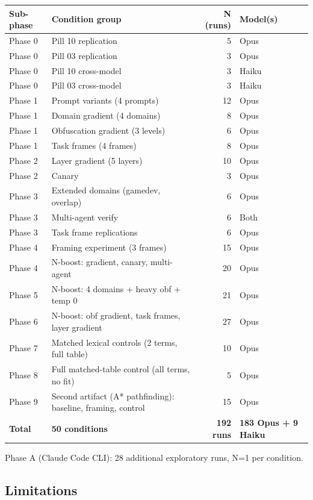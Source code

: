 \documentclass[11pt]{article}
\begin{document}
\begin{table}[ht]
\centering
\small
\begin{tabular}{@{}lp{6.5cm}rl@{}}
\toprule
Sub-phase & Condition group & N (runs) & Model(s) \\
\midrule
Phase 0 & Pill 10 replication & 5 & Opus \\
Phase 0 & Pill 03 replication & 3 & Opus \\
Phase 0 & Pill 10 cross-model & 3 & Haiku \\
Phase 0 & Pill 03 cross-model & 3 & Haiku \\
Phase 1 & Prompt variants (4 prompts) & 12 & Opus \\
Phase 1 & Domain gradient (4 domains) & 8 & Opus \\
Phase 1 & Obfuscation gradient (3 levels) & 6 & Opus \\
Phase 1 & Task frames (4 frames) & 8 & Opus \\
Phase 2 & Layer gradient (5 layers) & 10 & Opus \\
Phase 2 & Canary & 3 & Opus \\
Phase 3 & Extended domains (gamedev, overlap) & 6 & Opus \\
Phase 3 & Multi-agent verify & 6 & Both \\
Phase 3 & Task frame replications & 6 & Opus \\
Phase 4 & Framing experiment (3 frames) & 15 & Opus \\
Phase 4 & N-boost: gradient, canary, multi-agent & 20 & Opus \\
Phase 5 & N-boost: 4 domains + heavy obf + temp 0 & 21 & Opus \\
Phase 6 & N-boost: obf gradient, task frames, layer gradient & 27 & Opus \\
Phase 7 & Matched lexical controls (2 terms, full table) & 10 & Opus \\
Phase 8 & Full matched-table control (all terms, no fit) & 5 & Opus \\
Phase 9 & Second artifact (A* pathfinding): baseline, framing, control & 15 & Opus \\
\midrule
\textbf{Total} & \textbf{50 conditions} & \textbf{192 runs} & \textbf{183 Opus + 9 Haiku} \\
\bottomrule
\end{tabular}
\end{table}

Phase A (Claude Code CLI): 28 additional exploratory runs, N=1 per
condition.

\subsection{Limitations}
\end{document}
